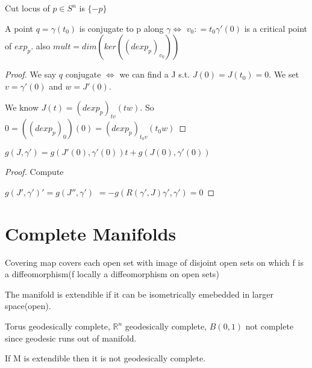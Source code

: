 \documentclass[11pt]{article}
\begin{document}
\begin{example}
	Cut locus of $p \in S^n$ is $\{-p\}$
\end{example}

\begin{prop}
	A point $q = \gamma(t_0)$ is conjugate to p along $\gamma \iff$ $v_0 : = t_0 \gamma'(0)$ is a critical point of $exp_p$. also $mult = dim(ker((d exp_p)_{v_0}))$
\end{prop}

\begin{proof}
	We say $q$ conjugate $\iff$ we can find a J s.t. $J(0) = J(t_0) = 0$. We set $v = \gamma'(0)$ and $w = J'(0)$. 

	We know $J(t) = (dexp_p)_{tv}(tw)$. So $0 = ((dexp_p)_0)(0) = (dexp_p)_{t_0v}(t_0 w)$ 
\end{proof}

\begin{prop}
	$g(J,\gamma') = g(J'(0),\gamma'(0))t + g(J(0),\gamma'(0))$
\end{prop}

\begin{proof}
	Compute
	
		$g(J',\gamma')' = g(J'',\gamma')$ 
		$= -g(R(\gamma',J)\gamma',\gamma')= 0$ 
	
\end{proof}

\section{Complete Manifolds}

\begin{remark}
	Covering map covers each open set with image of disjoint open sets on which f is a diffeomorphism(f locally a diffeomorphism on open sets)
\end{remark}

\begin{remark}
	The manifold is extendible if it can be isometrically emebedded in larger space(open).
\end{remark}

\begin{example}
	Torus geodesically complete, $\mathbb{R}^n$ geodesically complete, $B(0,1)$ not complete since geodesic runs out of manifold.
\end{example}

\begin{prop}
	If M is extendible then it is not geodesically complete. 
\end{prop}
\end{document}
